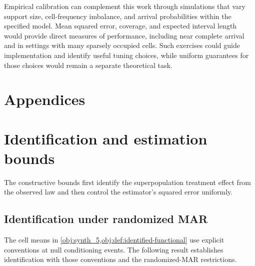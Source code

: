 \documentclass[11pt]{article}
\begin{document}
Empirical calibration can complement this work through simulations that vary support size, cell-frequency imbalance, and arrival probabilities within the specified model. Mean squared error, coverage, and expected interval length would provide direct measures of performance, including near complete arrival and in settings with many sparsely occupied cells. Such exercises could guide implementation and identify useful tuning choices, while uniform guarantees for those choices would remain a separate theoretical task.


\appendix

\section*{Appendices}

\section{Identification and estimation bounds}

The constructive bounds first identify the superpopulation treatment effect from the observed law and then control the estimator's squared error uniformly.

\subsection{Identification under randomized MAR}

The cell means in \cref{obj:synth_5,obj:def:identified-functional} use explicit conventions at null conditioning events. The following result establishes identification with those conventions and the randomized-MAR restrictions.
\end{document}
